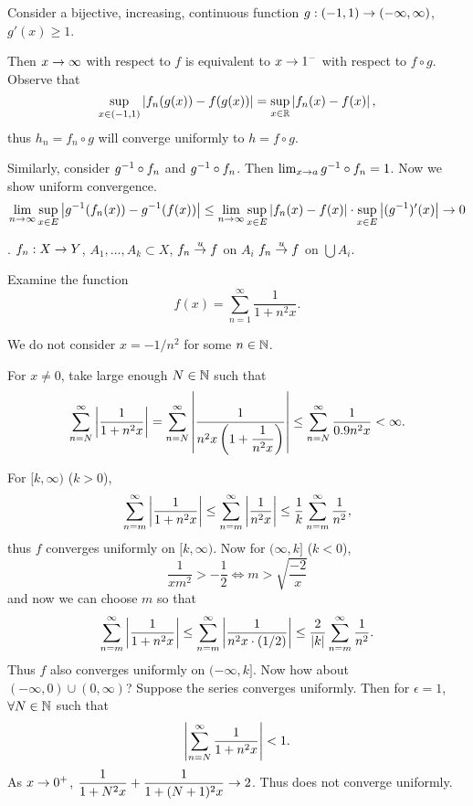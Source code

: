 \pf Consider a bijective, increasing, continuous function \(g: (-1, 1) \rightarrow (-\infty, \infty)\), \(g'(x) \geq 1\).

 Then \(x \rightarrow \infty\) with respect to \(f\) is equivalent to \(x \rightarrow 1^-\) with respect to \(f \circ g\). Observe that
\[
    \sup_{x \in (-1, 1)} \left| f_n(g(x)) - f(g(x)) \right| = \sup_{x \in \mathbb{R}} \left| f_n(x) - f(x) \right|,
\]
thus \(h_n = f_n \circ g\) will converge uniformly to \(h = f \circ g\).

 Similarly, consider \(g^{-1}\circ f_n\) and \(g^{-1}\circ f_n\). Then \(\lim_{x \rightarrow a} g^{-1}\circ f_n = 1\). Now we show uniform convergence.
\[
    \lim_{n \rightarrow \infty} \sup_{x \in E}\left| g^{-1}(f_n(x)) - g^{-1} (f(x)) \right| \leq \lim_{n \rightarrow \infty} \sup_{x \in E} \left| f_n(x) - f(x) \right| \cdot \sup_{x \in E} \left| (g^{-1})'(x) \right| \rightarrow 0
\]

\ex. \(f_n : X \rightarrow Y\), \(A_1, \dots, A_k \subset X\), \(f_n \overset{u}{\rightarrow} f\) on \(A_i\) \mimp \(f_n \overset{u}{\rightarrow} f\) on \(\bigcup A_i\).

 Examine the function
\[
    f(x) = \sum_{n=1}^\infty \frac{1}{1 + n^2 x}.
\]

\pf We do not consider \(x = -1/n^2\) for some \(n \in \mathbb{N}\).

 For \(x \neq 0\), take large enough \(N \in \mathbb{N}\) such that
\[
    \sum_{n = N}^\infty \left| \frac{1}{1+n^2 x} \right| = \sum_{n = N}^\infty \left| \frac{1}{n^2 x\left(1 + \dfrac{1}{n^2x}\right)} \right| \leq \sum_{n=N}^\infty \frac{1}{0.9n^2x} < \infty.
\]

 For \([k, \infty)\) (\(k > 0\)),
\[
    \sum_{n = m}^\infty \left| \frac{1}{1+n^2 x} \right| \leq \sum_{n = m}^\infty \left| \frac{1}{n^2 x} \right| \leq \frac{1}{k} \sum_{n = m}^\infty \frac{1}{n^2},
\]
thus \(f\) converges uniformly on \([k, \infty)\). Now for \((\infty, k]\) (\(k < 0\)),
\[
    \frac{1}{xm^2} > -\frac{1}{2} \iff m > \sqrt{\frac{-2}{x}}
\]
and now we can choose \(m\) so that
\[
    \sum_{n = m}^\infty \left| \frac{1}{1+n^2 x} \right| \leq \sum_{n = m}^\infty \left| \frac{1}{n^2x \cdot (1/2)} \right| \leq \frac{2}{\left| k \right|} \sum_{n=m}^\infty\frac{1}{n^2}.
\]
Thus \(f\) also converges uniformly on \((-\infty, k]\). Now how about \((-
\infty, 0) \cup (0, \infty)\)? Suppose the series converges uniformly. Then for \(\epsilon = 1\), \(\forall N \in \mathbb{N}\) such that
\[
    \left| \sum_{n = N}^\infty \frac{1}{1 + n^2 x} \right| < 1.
\]
As \(x \rightarrow 0^+\), \(\displaystyle \frac{1}{1+N^2x} + \frac{1}{1 + (N+1)^2x} \rightarrow 2\). Thus does not converge uniformly.

